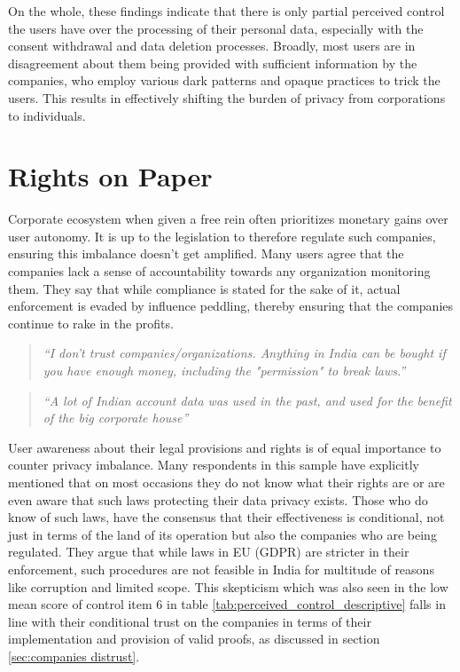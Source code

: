 On the whole, these findings indicate that there is only partial perceived control the users have over the processing of their personal data, especially with the consent withdrawal and data deletion processes. Broadly, most users are in disagreement about them being provided with sufficient information by the companies, who employ various dark patterns and opaque practices to trick the users. This results in effectively shifting the burden of privacy from corporations to individuals.

\section{Rights on Paper} \label{Sec: legal discussion} 

Corporate ecosystem when given a free rein often prioritizes monetary gains over user autonomy. It is up to the legislation to therefore regulate such companies, ensuring this imbalance doesn't get amplified. Many users agree that the companies lack a sense of accountability towards any organization monitoring them. They say that while compliance is stated for the sake of it, actual enforcement is evaded by influence peddling, thereby ensuring that the companies continue to rake in the profits. 

\begin{quote}
   \textit{ ``I don't trust companies/organizations. Anything in India can be bought if you have enough money, including the "permission" to break laws.''}
\end{quote}
\begin{quote}
    \textit{``A lot of Indian account data was used in the past, and used for the benefit of the big corporate house''}
\end{quote}

User awareness about their legal provisions and rights is of equal importance to counter privacy imbalance. Many respondents in this sample have explicitly mentioned that on most occasions they do not know what their rights are or are even aware that such laws protecting their data privacy exists. Those who do know of such laws, have the consensus that their effectiveness is conditional, not just in terms of the land of its operation but also the companies who are being regulated. They argue that while laws in EU (GDPR) are stricter in their enforcement, such procedures are not feasible in India for multitude of reasons like corruption and limited scope. This skepticism which was also seen in the low mean score of control item 6 in table \ref{tab:perceived_control_descriptive} falls in line with their conditional trust on the companies in terms of their implementation and provision of valid proofs, as discussed in section \ref{sec:companies distrust}.

